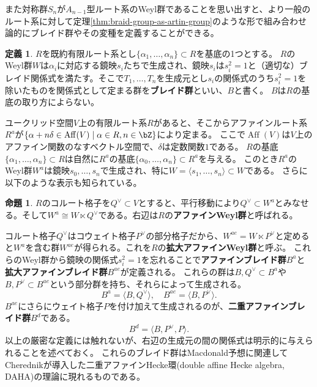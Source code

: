 \documentclass[uplatex,11pt,a4paper,dvipdfmx]{jsarticle}
\numberwithin{equation}{section}
\numberwithin{figure}{section}
\theoremstyle{definition}
\newtheorem{proposition}[theorem]{命題}
\newtheorem{definition}[theorem]{定義}
\DeclareMathOperator{\Aff}{Aff}
\begin{document}
また対称群$S_n$が$A_{n-1}$型ルート系のWeyl群であることを思い出すと、より一般のルート系に対して定理\ref{thm:braid-group-as-artin-group}のような形で組み合わせ論的にブレイド群やその変種を定義することができる。
\begin{definition}
    $R$を既約有限ルート系とし$\{\alpha_1, \dots, \alpha_n\} \subset R$を基底の1つとする。
    $R$のWeyl群$W$は$\alpha_i$に対応する鏡映$s_i$たちで生成され、鏡映$s_i$は$s_i^2=1$と（適切な）ブレイド関係式を満たす。そこで$T_1, \dots, T_n$を生成元とし$s_i$の関係式のうち$s_i^2=1$を除いたものを関係式として定まる群を\textbf{ブレイド群}といい、$B$と書く。
    $B$は$R$の基底の取り方によらない。
\end{definition}
ユークリッド空間$V$上の有限ルート系$R$があると、そこからアファインルート系$R^{a}$が$\{\alpha + n \delta \in \Aff(V) \mid \alpha \in R, n \in \bZ\}$により定まる。
ここで$\Aff(V)$は$V$上のアファイン関数のなすベクトル空間で、$\delta$は定数関数$1$である。
$R$の基底$\{\alpha_1, \dots, \alpha_n\} \subset R$は自然に$R^{a}$の基底$\{\alpha_0, \dots, \alpha_n\} \subset R^{a}$を与える。
このとき$R^{a}$のWeyl群$W^{a}$は鏡映$s_0, \dots, s_n$で生成され、特に$W = \langle s_1, \dots, s_n\rangle \subset W$である。
さらに以下のような表示も知られている。
\begin{proposition}
    $R$のコルート格子を$Q^\vee \subset V$とすると、平行移動により$Q^\vee \subset W^{a}$とみなせる。そして$W^{a} \cong W \ltimes Q^\vee$である。右辺は$R$の\textbf{アファインWeyl群}と呼ばれる。
\end{proposition}
コルート格子$Q^\vee$はコウェイト格子$P^\vee$の部分格子だから、$W^{ae} = W \ltimes P^\vee$と定めると$W^{a}$を含む群$W^{ae}$が得られる。これを$R$の\textbf{拡大アファインWeyl群}と呼ぶ。
これらのWeyl群から鏡映の関係式$s_i^2 = 1$を忘れることで\textbf{アファインブレイド群}$B^{a}$と\textbf{拡大アファインブレイド群}$B^{ae}$が定義される。
これらの群は$B, Q^\vee \subset B^{a}$や$B, P^\vee \subset B^{ae}$という部分群を持ち、それらによって生成される。
\begin{equation}
    B^{a} = \langle B, Q^\vee \rangle, \quad B^{ae} = \langle B, P^\vee \rangle.
\end{equation}
$B^{ae}$にさらにウェイト格子$P$を付け加えて生成されるのが、\textbf{二重アファインブレイド群}$B^{d}$である。
\begin{equation}
    B^{d} = \langle B, P^\vee, P\rangle.
\end{equation}
以上の厳密な定義には触れないが、右辺の生成元の間の関係式は明示的に与えられることを述べておく。
これらのブレイド群はMacdonald予想に関連してCherednikが導入した二重アファインHecke環(double affine Hecke algebra, DAHA)の理論に現れるものである。
\end{document}
